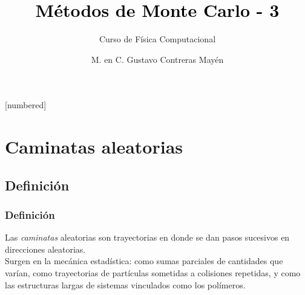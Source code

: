 



\normalfont
\usepackage{ccfonts}%
\usepackage[T1]{fontenc}%
\renewcommand{\rmdefault}{cmr}%
\linespread{1.3}
\title{\textcolor{black}{Métodos de Monte Carlo - 3}}
\subtitle{Curso de Física Computacional}
\author[]{M. en C. Gustavo Contreras Mayén}
[numbered]
\beamertemplatenavigationsymbolsempty

\newcommand{\localtextbulletone}{\textcolor{gray}{\raisebox{.45ex}{\rule{.6ex}{.6ex}}}}
\maketitle
\fontsize{14}{14}\selectfont
{}
\section{Caminatas aleatorias}
\subsection{Definición}
\begin{frame}
\frametitle{Definición}
Las \emph{caminatas} aleatorias son trayectorias en donde se dan pasos sucesivos en direcciones aleatorias.
\\
\bigskip
\pause
Surgen en la mecánica estadística: como sumas parciales de cantidades que varían, como trayectorias de partículas sometidas a colisiones repetidas, y como las estructuras largas de sistemas vinculados como los polímeros.
\end{frame}

